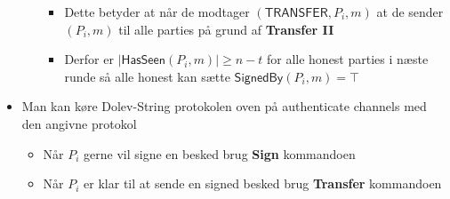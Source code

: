 \documentclass[a4, english]{article}
\begin{document}
\begin{itemize}
\begin{itemize}
\begin{itemize}
      \item Dette betyder at når de modtager $(\mathsf{TRANSFER}, P_i,m)$ at de sender $(P_i,m)$ til alle parties på grund af \textbf{Transfer II}
      \item Derfor er $|\mathsf{HasSeen}(P_i,m)| \geq n-t$ for alle honest parties i næste runde så alle honest kan sætte $\mathsf{SignedBy}(P_i,m) = \top$ 
    \end{itemize}
  \end{itemize}
  \item Man kan køre Dolev-String protokolen oven på authenticate channels med den angivne protokol 
  \begin{itemize}
  	\item Når $P_i$ gerne vil signe en besked brug \textbf{Sign} kommandoen
  	\item Når $P_i$ er klar til at sende en signed besked brug \textbf{Transfer} kommandoen
  \end{itemize}
\end{itemize}
\end{document}
